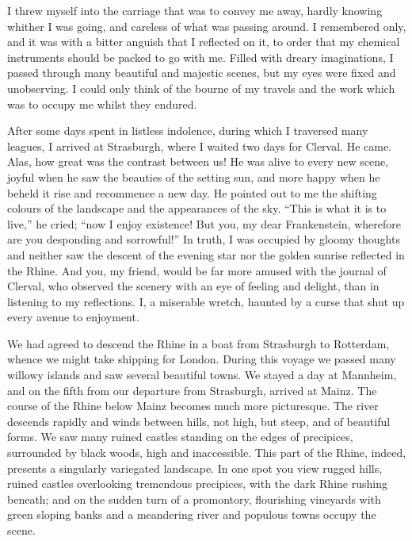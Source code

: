 \documentclass[12pt,openright]{book}
\begin{document}
I threw myself into the carriage that was to convey me away, hardly knowing whither I was going, and careless of what was passing around. I remembered only, and it was with a bitter anguish that I reflected on it, to order that my chemical instruments should be packed to go with me. Filled with dreary imaginations, I passed through many beautiful and majestic scenes, but my eyes were fixed and unobserving. I could only think of the bourne of my travels and the work which was to occupy me whilst they endured.

After some days spent in listless indolence, during which I traversed many leagues, I arrived at Strasburgh, where I waited two days for Clerval. He came. Alas, how great was the contrast between us! He was alive to every new scene, joyful when he saw the beauties of the setting sun, and more happy when he beheld it rise and recommence a new day. He pointed out to me the shifting colours of the landscape and the appearances of the sky. “This is what it is to live,” he cried; “now I enjoy existence! But you, my dear Frankenstein, wherefore are you desponding and sorrowful!” In truth, I was occupied by gloomy thoughts and neither saw the descent of the evening star nor the golden sunrise reflected in the Rhine. And you, my friend, would be far more amused with the journal of Clerval, who observed the scenery with an eye of feeling and delight, than in listening to my reflections. I, a miserable wretch, haunted by a curse that shut up every avenue to enjoyment.

We had agreed to descend the Rhine in a boat from Strasburgh to Rotterdam, whence we might take shipping for London. During this voyage we passed many willowy islands and saw several beautiful towns. We stayed a day at Mannheim, and on the fifth from our departure from Strasburgh, arrived at Mainz. The course of the Rhine below Mainz becomes much more picturesque. The river descends rapidly and winds between hills, not high, but steep, and of beautiful forms. We saw many ruined castles standing on the edges of precipices, surrounded by black woods, high and inaccessible. This part of the Rhine, indeed, presents a singularly variegated landscape. In one spot you view rugged hills, ruined castles overlooking tremendous precipices, with the dark Rhine rushing beneath; and on the sudden turn of a promontory, flourishing vineyards with green sloping banks and a meandering river and populous towns occupy the scene.
\end{document}
